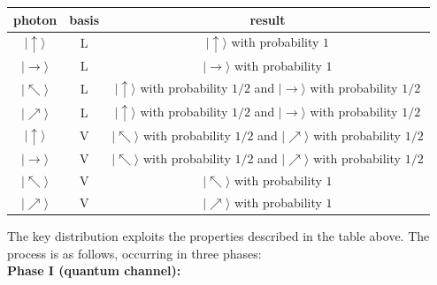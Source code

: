 \documentclass{article}
\theoremstyle{plain}
\theoremstyle{definition}
\theoremstyle{remark}
\numberwithin{theorem}{section}
\begin{document}
\begin{center}

\begin{tabular}{ccc}
photon & basis & result \\
\hline
$|\uparrow \rangle$ & L & $|\uparrow \rangle$ with probability $1$ \\
$|\rightarrow \rangle$ & L & $ |\rightarrow \rangle$ with probability $1$ \\
$|\nwarrow \rangle$ & L&  $ |\uparrow \rangle$ with probability $1/2$ and $|\rightarrow \rangle$ with probability $1/2$ \\
$|\nearrow \rangle$ & L&  $ |\uparrow \rangle$ with probability $1/2$ and $|\rightarrow \rangle$ with probability $1/2$ \\
$|\uparrow \rangle$ & V & $|\nwarrow \rangle$ with probability $1/2$ and $|\nearrow \rangle$ with probability $1/2$\\
$|\rightarrow \rangle$ & V & $|\nwarrow \rangle$ with probability $1/2$ and $|\nearrow \rangle$ with probability $1/2$ \\
$|\nwarrow \rangle$ & V & $ |\nwarrow \rangle$ with probability $1$ \\
$|\nearrow \rangle$ & V & $ |\nearrow \rangle$ with probability $1$ \\
\end{tabular}

\end{center}
\vspace{1em}

The key distribution exploits the properties described in the table above.  The process is as follows, occurring in three phases:\\

\textbf{Phase I (quantum channel):}
\end{document}
